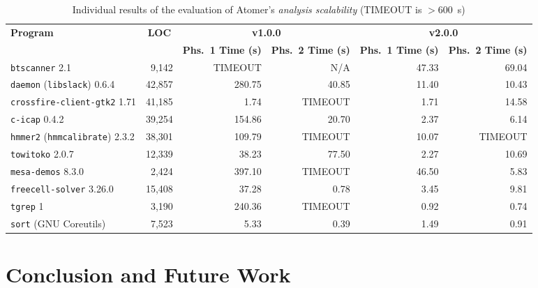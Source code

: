 \documentclass{ExcelAtFIT}
\theoremstyle{example}
\begin{document}
\begin{table*}[t]
    \centering

    \begin{tabular}{|l|r|r|r|r|r|}
        \hline
        \multirow{2}{*}{\textbf{Program}} & \multicolumn{1}{c|}{\multirow{2}{*}{\textbf{LOC}}} & \multicolumn{2}{c|}{\textbf{v1.0.0}} & \multicolumn{2}{c|}{\textbf{v2.0.0}} \\ \cline{3-6}
        & & \textbf{Phs.~1 Time (s)} & \textbf{Phs.~2 Time (s)} & \textbf{Phs.~1 Time (s)} & \textbf{Phs.~2 Time (s)} \\ \hline \hline
        \texttt{btscanner} 2.1 & 9,142 & TIMEOUT & N/A & 47.33 & 69.04 \\ \hline
        \texttt{daemon} (\texttt{libslack}) 0.6.4 & 42,857 & 280.75 & 40.85 & 11.40 & 10.43 \\ \hline
        \texttt{crossfire-client-gtk2} 1.71 & 41,185 & 1.74 & TIMEOUT & 1.71 & 14.58 \\ \hline
        \texttt{c-icap} 0.4.2 & 39,254 & 154.86 & 20.70 & 2.37 & 6.14 \\ \hline
        \texttt{hmmer2} (\texttt{hmmcalibrate}) 2.3.2 & 38,301 & 109.79 & TIMEOUT & 10.07 & TIMEOUT \\ \hline
        \texttt{towitoko} 2.0.7 & 12,339 & 38.23 & 77.50 & 2.27 & 10.69 \\ \hline
        \texttt{mesa-demos} 8.3.0 & 2,424 & 397.10 & TIMEOUT & 46.50 & 5.83 \\ \hline
        \texttt{freecell-solver} 3.26.0 & 15,408 & 37.28 & 0.78 & 3.45 & 9.81 \\ \hline \hline
        \texttt{tgrep} 1 & 3,190 & 240.36 & TIMEOUT & 0.92 & 0.74 \\ \hline
        \texttt{sort} (GNU Coreutils) & 7,523 & 5.33 & 0.39 & 1.49 & 0.91 \\ \hline
    \end{tabular}

    \caption{Individual results of the evaluation of Atomer's \emph{analysis scalability} (TIMEOUT is $ >\!600 $\ \!s)}
    \label{tab:expScal}
\end{table*}


\section{Conclusion and Future Work}
\label{sec:conc}
\end{document}
